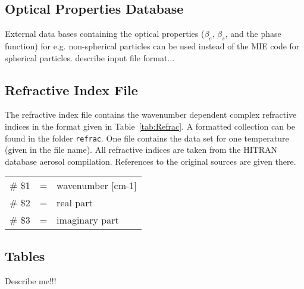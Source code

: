 
\subsection{Optical Properties Database}
\label{sec:OptData}
External data bases containing the optical properties ($\beta_e$, $\beta_s$, and the phase function) for e.g. non-spherical particles can be used instead of the MIE code for spherical particles.
\todo describe input file format... 


\subsection{Refractive Index File}
\label{sec:Refrac}
The refractive index file contains the wavenumber dependent complex refractive indices in the format given in Table~\ref{tab:Refrac}. A formatted collection can be found in the folder \texttt{refrac}. One file contains the data set for one temperature (given in the file name). All refractive indices are taken from the HITRAN database \citep{Rothman2009} aerosol compilation. References to the original sources are given there.

\begin{table*}[!h]
\caption{Columns of the refractive index files}
\begin{tabular}{lcl}
\# \$1 & = & wavenumber [cm-1] \\
\# \$2 & = & real part \\
\# \$3 & = & imaginary part \\
\end{tabular}
\label{tab:Refrac}
\end{table*} 


\subsection{Tables}
\label{sec:Tables}
\todo Describe me!!!

